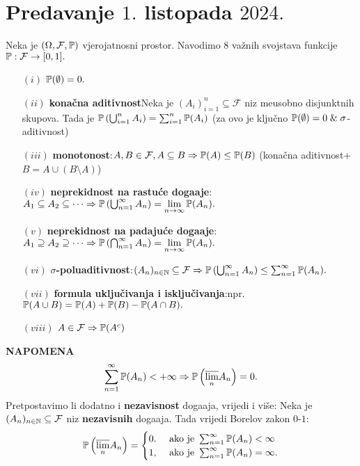 \documentclass{article}
\begin{document}
\section{Predavanje \(1.\) listopada \(2024.\)}
Neka je \((\Omega,\mathcal F,\Bbb P)\) vjerojatnosni prostor. Navodimo \(8\) važnih svojstava funkcije \(\Bbb P:\mathcal F\to[0,1].\)
\begin{enumerate}
    \item[\((i)\)] \(\Bbb P(\emptyset)=0.\)
    \item[\((ii)\)] \textbf{konačna aditivnost}\newline Neka je \((A_i)_{i=1}^n\subseteq\mathcal F\) niz me\dj{}usobno disjunktnih skupova. Tada je \(\Bbb P\left(\bigcup_{i=1}^nA_i\right)=\sum_{i=1}^n\Bbb P(A_i)\) (za ovo je ključno \(\Bbb P(\emptyset)=0\;\&\;\sigma\)-aditivnost)
    \item[\((iii)\)] \textbf{monotonost}:\newline \(A, B\in\mathcal F,A\subseteq B\Rightarrow\Bbb P(A)\le\Bbb P(B)\) (konačna aditivnost+\(B=A\cup (B\setminus A)\))
    \item[\((iv)\)] \textbf{neprekidnost na rastuće doga\dj{}aje}:\newline \(A_1\subseteq A_2\subseteq\cdots\Rightarrow\Bbb P\left(\bigcup_{n=1}^\infty A_n\right)=\lim\limits_{n\to\infty}\Bbb P(A_n).\)
    \item[\((v)\)] \textbf{neprekidnost na padajuće doga\dj{}aje}:\newline \(A_1\supseteq A_2\supseteq\cdots\Rightarrow\Bbb P\left(\bigcap_{n=1}^\infty A_n\right)=\lim\limits_{n\to\infty}\Bbb P(A_n).\)
    \item[\((vi)\)] \textbf{\(\sigma\)-poluaditivnost}:\newline \((A_n)_{n\in\Bbb N}\subseteq\mathcal F\Rightarrow\Bbb P\left(\bigcup_{n=1}^\infty A_n\right)\le\sum_{n=1}^\infty\Bbb P(A_n).\)
    \item[\((vii)\)] \textbf{formula uključivanja i isključivanja}:\newline npr. \(\Bbb P(A\cup B)=\Bbb P(A)+\Bbb P(B)-\Bbb P(A\cap B).\) 
    \item[\((viii)\)] \(A\in\mathcal F\Rightarrow\Bbb P(A^c)\)
\end{enumerate}
\textbf{NAPOMENA} \[\sum_{n=1}^\infty\Bbb P(A_n)<+\infty\Rightarrow\Bbb P\left(\overline{\lim_n}A_n\right)=0.\] Pretpostavimo li dodatno i \textbf{nezavisnost} doga\dj{}aja, vrijedi i više:\newline 
Neka je \((A_n)_{n\in\Bbb N}\subseteq\mathcal F\) niz \textbf{nezavisnih} doga\dj{}aja. Tada vrijedi Borelov zakon \(0\)-\(1\): \[\Bbb P\left(\overline{\lim_n}A_n\right)=\begin{cases}0.&\text{ ako je }\sum_{n=1}^\infty\Bbb P(A_n)<\infty\\1,&\text{ ako je }\sum_{n=1}^\infty\Bbb P(A_n)=\infty.\end{cases}\]
\end{document}
